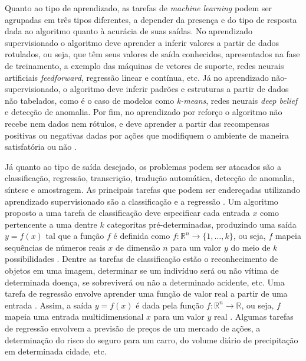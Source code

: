 Quanto ao tipo de aprendizado, as tarefas de \emph{machine learning} podem ser agrupadas em três tipos diferentes, a depender da presença e do tipo de resposta dada ao algoritmo quanto à acurácia de suas saídas. No aprendizado supervisionado o algoritmo deve aprender a inferir valores a partir de dados rotulados, ou seja, que têm seus valores de saída conhecidos, apresentados na fase de treinamento, a exemplo das máquinas de vetores de suporte, redes neurais artificiais \emph{feedforward}, regressão linear e contínua, etc. Já no aprendizado não-supervisionado, o algoritmo deve inferir padrões e estruturas a partir de dados não tabelados, como é o caso de modelos como \emph{k-means}, redes neurais \emph{deep belief} e detecção de anomalia. Por fim, no aprendizado por reforço o algoritmo não recebe nem dados nem rótulos, e deve aprender a partir das recompensas positivas ou negativas dadas por ações que modifiquem o ambiente de maneira satisfatória ou não \cite{flach2012machine}.

Já quanto ao tipo de saída desejado, os problemas podem ser atacados são a classificação, regressão, transcrição, tradução automática, detecção de anomalia, síntese e amostragem. As principais tarefas que podem ser endereçadas utilizando aprendizado supervisionado são a classificação e a regressão \cite{flach2012machine}. Um algoritmo proposto a uma tarefa de classificação deve especificar cada entrada $x$ como pertencente a uma dentre $k$ categoritas pré-determinadas, produzindo uma saída $y=f(x)$ tal que a função $f$ é definida como $f: \mathds{R}^n \rightarrow \{1, \ldots, k\}$, ou seja, $f$ mapeia sequências de números reais  $x$ de dimensão $n$ para um valor $y$ do meio de $k$ possibilidades \cite{goodfellow2016deep}. Dentre as tarefas de classificação estão o reconhecimento de objetos em uma imagem, determinar se um indivíduo será ou não vítima de determinada doença, se sobreviverá ou não a determinado acidente, etc. Uma tarefa de regressão envolve aprender uma função de valor real a partir de uma entrada \cite{flach2012machine}. Assim, a saída $y=f(x)$ é dada pela função $f: \mathds{R}^n \rightarrow \mathds{R}$, ou seja, $f$ mapeia uma entrada multidimensional $x$ para um valor $y$ real  \cite{goodfellow2016deep}. Algumas tarefas de regressão envolvem a previsão de preços de um mercado de ações, a determinação do risco do seguro para um carro, do volume diário de precipitação em determinada cidade, etc.
